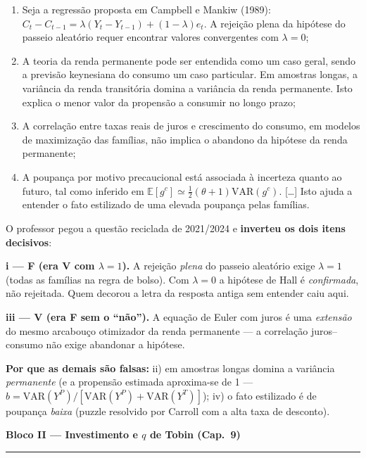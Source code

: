 \documentclass[12pt, a4paper]{article}
\newcommand{\E}{\mathbb{E}}
\newcommand{\VAR}{\mathrm{VAR}}
\begin{document}
\begin{enumerate}[label=\roman*)]
\item Seja a regressão proposta em Campbell e Mankiw (1989):
$C_t - C_{t-1} = \lambda(Y_t - Y_{t-1}) + (1-\lambda)e_t$. A rejeição plena da
hipótese do passeio aleatório requer encontrar valores convergentes com
$\lambda = 0$;
\item A teoria da renda permanente pode ser entendida como um caso geral,
sendo a previsão keynesiana do consumo um caso particular. Em amostras longas,
a variância da renda transitória domina a variância da renda permanente. Isto
explica o menor valor da propensão a consumir no longo prazo;
\item A correlação entre taxas reais de juros e crescimento do consumo, em
modelos de maximização das famílias, não implica o abandono da hipótese da
renda permanente;
\item A poupança por motivo precaucional está associada à incerteza quanto ao
futuro, tal como inferido em
$\E[g^c] \simeq \tfrac{1}{2}(\theta+1)\VAR(g^c)$. [\ldots] Isto ajuda a
entender o fato estilizado de uma elevada poupança pelas famílias.
\end{enumerate}

\begin{correctbox}[title={Resposta: iii) --- P2 2021/2024 Q1 com \emph{dupla inversão} de itens}]
O professor pegou a questão reciclada de 2021/2024 e \textbf{inverteu os dois
itens decisivos}:

\textbf{i --- F (era V com $\lambda = 1$).} A rejeição \emph{plena} do passeio
aleatório exige $\lambda = 1$ (todas as famílias na regra de bolso). Com
$\lambda = 0$ a hipótese de Hall é \emph{confirmada}, não rejeitada. Quem
decorou a letra da resposta antiga sem entender caiu aqui.

\textbf{iii --- V (era F sem o ``não'').} A equação de Euler com juros é uma
\emph{extensão} do mesmo arcabouço otimizador da renda permanente --- a
correlação juros--consumo não exige abandonar a hipótese.

\textbf{Por que as demais são falsas:} ii) em amostras longas domina a
variância \emph{permanente} (e a propensão estimada aproxima-se de 1 ---
$\hat b = \VAR(Y^P)/[\VAR(Y^P)+\VAR(Y^T)]$); iv) o fato estilizado é de
poupança \emph{baixa} (puzzle resolvido por Carroll com a alta taxa de
desconto).
\end{correctbox}

\begin{center}
{\large\bfseries\color{cyanrbc} Bloco II --- Investimento e $q$ de Tobin (Cap.\ 9)}\\[0.2em]
\rule{\linewidth}{0.6pt}
\end{center}
\end{document}
